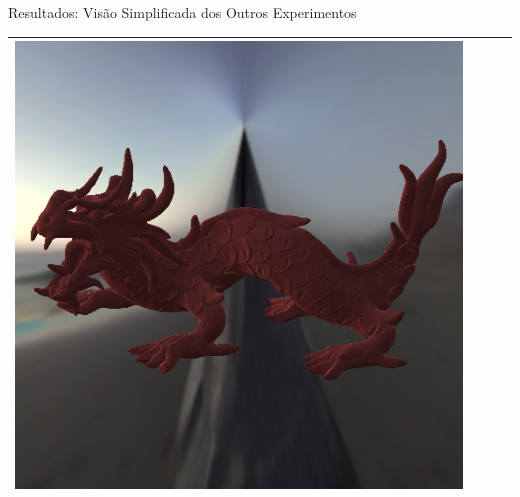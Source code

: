\begin{frame}[fragile]{Resultados: Visão Simplificada dos Outros Experimentos}
\begin{table}
\begin{tabular}{|c|c|c|c|}
           \includegraphics[scale=0.14]{./Imagens/brdfs/minnaert-dragon.png}\\ \hline
       \end{tabular}
   \end{table}
\end{frame}

